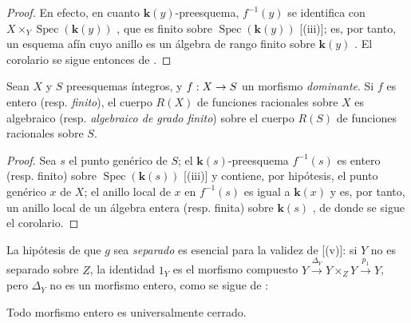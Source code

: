 \documentclass[oneside,10pt]{amsart}
\makeatletter
\newcommand{\ega@arrow}[2]{\mathchoice{#1}{#2}{#2}{#2}}
\renewcommand{\to}{\ega@arrow{\longrightarrow}{\rightarrow}}
\let\EGAOriginalLabel\label
\renewcommand{\label}[1]{\phantomsection\EGAOriginalLabel{#1}}
\makeatother
\begin{document}
\begin{proof}
En efecto, en cuanto $\boldsymbol{k}(y)$-preesquema, $f^{-1}(y)$ se identifica con $X\times_Y\operatorname{Spec}(\boldsymbol{k}(y))$ , que es finito sobre $\operatorname{Spec}(\boldsymbol{k}(y))$ [(iii)];
es, por tanto, un esquema afín cuyo anillo es un álgebra de rango finito sobre $\boldsymbol{k}(y)$ .
El corolario se sigue entonces de .
\end{proof}

\begin{corollary}[6.1.8]
\label{II.6.1.8-fr}
Sean $X$ y $S$ preesquemas íntegros, y $f:X\to S$ un morfismo \emph{dominante}.
Si $f$ es entero \textup{(resp. \emph{finito})}, el cuerpo $R(X)$ de funciones racionales sobre $X$ es algebraico \textup{(resp. \emph{algebraico de grado finito})} sobre el cuerpo $R(S)$ de funciones racionales sobre $S$.
\end{corollary}

\begin{proof}
Sea $s$ el punto genérico de $S$;
el $\boldsymbol{k}(s)$-preesquema $f^{-1}(s)$ es entero (resp. finito) sobre $\operatorname{Spec}(\boldsymbol{k}(s))$ [(iii)] y contiene, por hipótesis, el punto genérico $x$ de $X$;
el anillo local de $x$ en $f^{-1}(s)$ es igual a $\boldsymbol{k}(x)$  y es, por tanto, un anillo local de un álgebra entera (resp. finita) sobre $\boldsymbol{k}(s)$ , de donde se sigue el corolario.
\end{proof}

\begin{remark}[6.1.9]
\label{II.6.1.9-fr}
La hipótesis de que $g$ sea \emph{separado} es esencial para la validez de [(v)]: si $Y$ no es separado sobre $Z$, la identidad $1_Y$ es el morfismo compuesto $Y\xrightarrow{\Delta_Y}Y\times_ZY\xrightarrow{p_1}Y$, pero $\Delta_Y$ no es un morfismo entero, como se sigue de :
\end{remark}

\begin{proposition}[6.1.10]
\label{II.6.1.10-fr}
Todo morfismo entero es universalmente cerrado.
\end{proposition}
\end{document}
